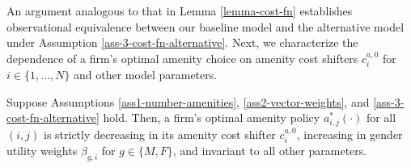 An argument analogous to that in Lemma \ref{lemma-cost-fn} establishes observational equivalence between our baseline model and the alternative model under Assumption \ref{ass-3-cost-fn-alternative}. Next, we characterize the dependence of a firm's optimal amenity choice on amenity cost shifters $c_{i}^{a,0}$ for $i\in\{1, \ldots ,N\}$ and other model parameters.
%
\newcommand{\LemmaCounterfactualEquivalence}{%
    Suppose Assumptions \ref{ass1-number-amenities}, \ref{ass2-vector-weights}, and \ref{ass-3-cost-fn-alternative} hold. Then, a firm's optimal amenity policy $a_{i,j}^{*}\left(\cdot\right)$ for all $(i,j)$ is strictly decreasing in its amenity cost shifter $c_{i}^{a,0}$, increasing in gender utility weights $\beta_{g,i}$ for $g \in \{ M,F \}$, and invariant to all other parameters.
}
%
\begin{lemma}
    \label{lem:amenities-counterfactual-equiv}
    \LemmaCounterfactualEquivalence
\end{lemma}
%
